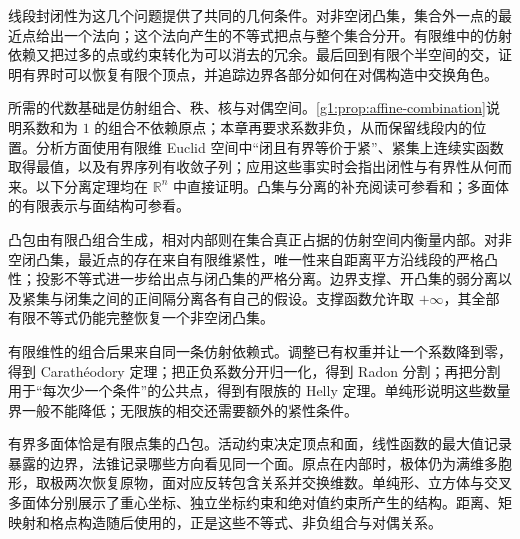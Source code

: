\ProseParagraphBreak

线段封闭性为这几个问题提供了共同的几何条件。对非空闭凸集，集合外一点的最近点给出一个法向；这个法向产生的不等式把点与整个集合分开。有限维中的仿射依赖又把过多的点或约束转化为可以消去的冗余。最后回到有限个半空间的交，证明有界时可以恢复有限个顶点，并追踪边界各部分如何在对偶构造中交换角色。

\ProseParagraphBreak

所需的代数基础是仿射组合、秩、核与对偶空间。\cref{g1:prop:affine-combination}说明系数和为 \(1\) 的组合不依赖原点；本章再要求系数非负，从而保留线段内的位置。分析方面使用有限维 Euclid 空间中“闭且有界等价于紧”、紧集上连续实函数取得最值，以及有界序列有收敛子列；应用这些事实时会指出闭性与有界性从何而来。以下分离定理均在 \(\mathbb R^n\) 中直接证明。凸集与分离的补充阅读可参看\cite[第2.1, 2.5--2.6节]{BoydVandenberghe2004}和\cite[第3.1--3.2, 3.4, 7.1--7.2节]{Gallier2011Geometric}；多面体的有限表示与面结构可参看\cite[第1.1, 2.1--2.4节]{Ziegler1995}。






\begin{chaptersummary}
	凸包由有限凸组合生成，相对内部则在集合真正占据的仿射空间内衡量内部。对非空闭凸集，最近点的存在来自有限维紧性，唯一性来自距离平方沿线段的严格凸性；投影不等式进一步给出点与闭凸集的严格分离。边界支撑、开凸集的弱分离以及紧集与闭集之间的正间隔分离各有自己的假设。支撑函数允许取 \(+\infty\)，其全部有限不等式仍能完整恢复一个非空闭凸集。

	\ProseParagraphBreak

	有限维性的组合后果来自同一条仿射依赖式。调整已有权重并让一个系数降到零，得到 Carathéodory 定理；把正负系数分开归一化，得到 Radon 分割；再把分割用于“每次少一个条件”的公共点，得到有限族的 Helly 定理。单纯形说明这些数量界一般不能降低；无限族的相交还需要额外的紧性条件。

	\ProseParagraphBreak

	有界多面体恰是有限点集的凸包。活动约束决定顶点和面，线性函数的最大值记录暴露的边界，法锥记录哪些方向看见同一个面。原点在内部时，极体仍为满维多胞形，取极两次恢复原物，面对应反转包含关系并交换维数。单纯形、立方体与交叉多面体分别展示了重心坐标、独立坐标约束和绝对值约束所产生的结构。距离、矩映射和格点构造随后使用的，正是这些不等式、非负组合与对偶关系。
\end{chaptersummary}

\BookExercises

